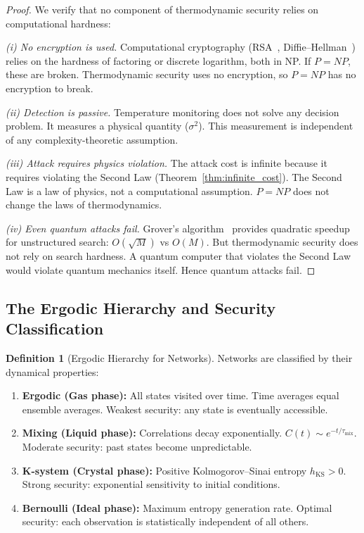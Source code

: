 \documentclass[11pt,twocolumn,a4paper]{article}
\theoremstyle{definition}
\newtheorem{definition}[theorem]{Definition}
\begin{document}
\begin{proof}
We verify that no component of thermodynamic security relies on computational hardness:

\emph{(i) No encryption is used.} Computational cryptography (RSA~\cite{rivest1978},
Diffie--Hellman~\cite{diffie1976}) relies on the hardness of factoring or discrete
logarithm, both in NP. If $P = NP$, these are broken. Thermodynamic security uses no
encryption, so $P = NP$ has no encryption to break.

\emph{(ii) Detection is passive.} Temperature monitoring does not solve any decision
problem. It measures a physical quantity ($\sigma^2$). This measurement is independent of
any complexity-theoretic assumption.

\emph{(iii) Attack requires physics violation.} The attack cost is infinite because it
requires violating the Second Law (Theorem~\ref{thm:infinite_cost}). The Second Law
is a law of physics, not a computational assumption. $P = NP$ does not change the laws
of thermodynamics.

\emph{(iv) Even quantum attacks fail.} Grover's algorithm~\cite{grover1996} provides
quadratic speedup for unstructured search: $O(\sqrt{M})$ vs $O(M)$. But thermodynamic
security does not rely on search hardness. A quantum computer that violates the Second
Law would violate quantum mechanics itself. Hence quantum attacks fail.
\end{proof}

\subsection{The Ergodic Hierarchy and Security Classification}\label{sec:security:ergodic}

\begin{definition}[Ergodic Hierarchy for Networks]\label{def:ergodic_hierarchy}
Networks are classified by their dynamical properties:
\begin{enumerate}[label=(\roman*)]
  \item \textbf{Ergodic (Gas phase):} All states visited over time. Time averages equal
        ensemble averages. Weakest security: any state is eventually accessible.
  \item \textbf{Mixing (Liquid phase):} Correlations decay exponentially.
        $C(t) \sim e^{-t/\tau_{\mathrm{mix}}}$. Moderate security: past states become
        unpredictable.
  \item \textbf{K-system (Crystal phase):} Positive Kolmogorov--Sinai entropy
        $h_{\mathrm{KS}} > 0$. Strong security: exponential sensitivity to initial
        conditions.
  \item \textbf{Bernoulli (Ideal phase):} Maximum entropy generation rate. Optimal
        security: each observation is statistically independent of all others.
\end{enumerate}
\end{definition}
\end{document}
